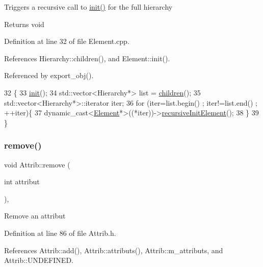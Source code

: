 Triggers a recursive call to \hyperlink{classUsbFTMLInterface_a7f7c96ece97e607b88425823a2923a43}{init()} for the full hierarchy

\begin{DoxyReturn}{Returns}
void 
\end{DoxyReturn}


Definition at line 32 of file Element.\+cpp.



References Hierarchy\+::children(), and Element\+::init().



Referenced by export\+\_\+obj().


\begin{DoxyCode}
32                                   \{
33   \hyperlink{classElement_af42754b5cabc198869222725218d695c}{init}();
34   std::vector<Hierarchy*> list = \hyperlink{classHierarchy_aa9a76f69e98e052ee1a6e32cea006288}{children}();
35   std::vector<Hierarchy*>::iterator iter;
36   \textcolor{keywordflow}{for} (iter=list.begin() ; iter!=list.end() ; ++iter)\{
37     \textcolor{keyword}{dynamic\_cast<}\hyperlink{classElement}{Element}*\textcolor{keyword}{>}((*iter))->\hyperlink{classElement_a3c0abcb36f8906688bb7e32608df7086}{recursiveInitElement}();
38   \}
39 \}
\end{DoxyCode}
\mbox{\label{classAttrib_a7d4ef7e32d93cb287792b87b857e79f3}} 
\subsubsection{\texorpdfstring{remove()}{remove()}}
{\footnotesize\ttfamily void Attrib\+::remove (\begin{DoxyParamCaption}\item[{int}]{attribut }\end{DoxyParamCaption})\hspace{0.3cm}{\ttfamily [inline]}, {\ttfamily [inherited]}}

Remove an attribut 

Definition at line 86 of file Attrib.\+h.



References Attrib\+::add(), Attrib\+::attributs(), Attrib\+::m\+\_\+attributs, and Attrib\+::\+U\+N\+D\+E\+F\+I\+N\+ED.



